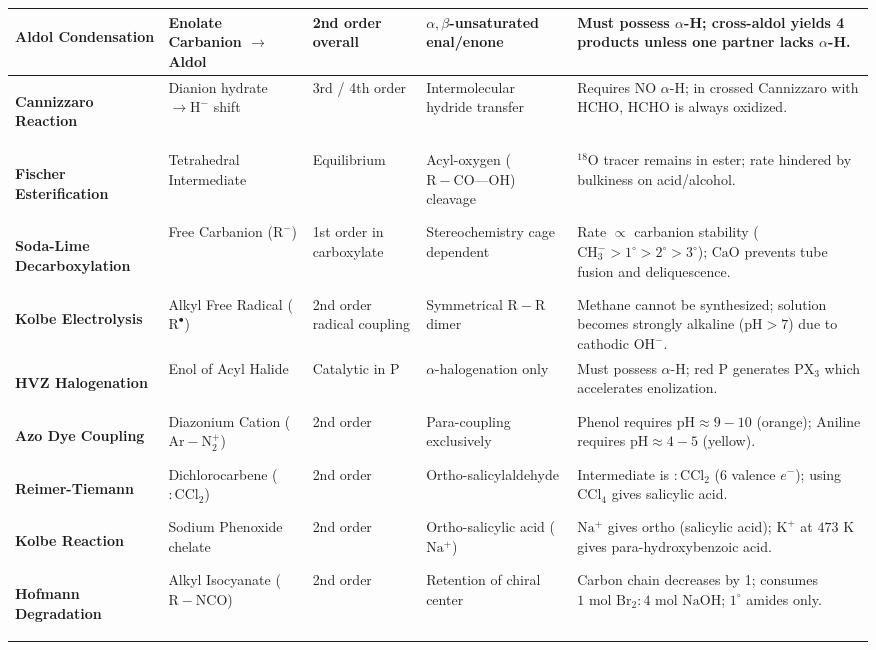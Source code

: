 \documentclass[10pt,a4paper]{article}
\begin{document}
\begin{center}
\begin{tabularx}{\linewidth}{|>{\bfseries\raggedright\arraybackslash}p{2.2cm}|>{\raggedright\arraybackslash}p{2.4cm}|>{\raggedright\arraybackslash}p{1.6cm}|L|L|}
\hline
\textbf{Aldol Condensation} & Enolate Carbanion $\to$ Aldol & 2nd order overall & $\alpha,\beta$-unsaturated enal/enone & Must possess $\alpha$-H; cross-aldol yields 4 products unless one partner lacks $\alpha$-H. \\
\hline
\textbf{Cannizzaro Reaction} & Dianion hydrate $\to \mathrm{H^-}$ shift & 3rd / 4th order & Intermolecular hydride transfer & Requires NO $\alpha$-H; in crossed Cannizzaro with $\mathrm{HCHO}$, $\mathrm{HCHO}$ is always oxidized. \\
\hline
\textbf{Fischer Esterification} & Tetrahedral Intermediate & Equilibrium & Acyl-oxygen ($\mathrm{R-CO\text{---}OH}$) cleavage & $^{18}\mathrm{O}$ tracer remains in ester; rate hindered by bulkiness on acid/alcohol. \\
\hline
\textbf{Soda-Lime Decarboxylation} & Free Carbanion ($\mathrm{R^-}$) & 1st order in carboxylate & Stereochemistry cage dependent & Rate $\propto$ carbanion stability ($\mathrm{CH_3^-} > 1^\circ > 2^\circ > 3^\circ$); $\mathrm{CaO}$ prevents tube fusion and deliquescence. \\
\hline
\textbf{Kolbe Electrolysis} & Alkyl Free Radical ($\mathrm{R^\bullet}$) & 2nd order radical coupling & Symmetrical $\mathrm{R-R}$ dimer & Methane cannot be synthesized; solution becomes strongly alkaline ($\mathrm{pH} > 7$) due to cathodic $\mathrm{OH^-}$. \\
\hline
\textbf{HVZ Halogenation} & Enol of Acyl Halide & Catalytic in $\mathrm{P}$ & $\alpha$-halogenation only & Must possess $\alpha$-H; red $\mathrm{P}$ generates $\mathrm{PX_3}$ which accelerates enolization. \\
\hline
\textbf{Azo Dye Coupling} & Diazonium Cation ($\mathrm{Ar-N_2^+}$) & 2nd order & Para-coupling exclusively & Phenol requires $\mathrm{pH} \approx 9-10$ (orange); Aniline requires $\mathrm{pH} \approx 4-5$ (yellow). \\
\hline
\textbf{Reimer-Tiemann} & Dichlorocarbene ($:\mathrm{CCl_2}$) & 2nd order & Ortho-salicylaldehyde & Intermediate is $:\mathrm{CCl_2}$ (6 valence $e^-$); using $\mathrm{CCl_4}$ gives salicylic acid. \\
\hline
\textbf{Kolbe Reaction} & Sodium Phenoxide chelate & 2nd order & Ortho-salicylic acid ($\mathrm{Na^+}$) & $\mathrm{Na^+}$ gives ortho (salicylic acid); $\mathrm{K^+}$ at $473\text{ K}$ gives para-hydroxybenzoic acid. \\
\hline
\textbf{Hofmann Degradation} & Alkyl Isocyanate ($\mathrm{R-NCO}$) & 2nd order & Retention of chiral center & Carbon chain decreases by 1; consumes $1\text{ mol } \mathrm{Br_2} : 4\text{ mol } \mathrm{NaOH}$; $1^\circ$ amides only. \\
\hline
\end{tabularx}
\end{center}
\end{document}

